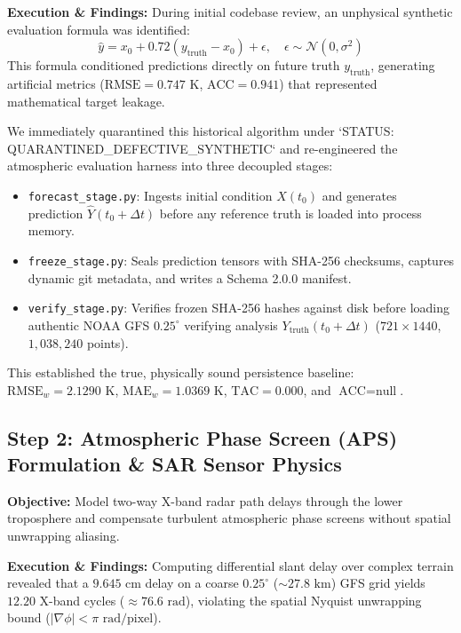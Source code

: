 \documentclass[10pt,twocolumn,letterpaper]{article}
\begin{document}
\textbf{Execution \& Findings:} During initial codebase review, an unphysical synthetic evaluation formula was identified:
\begin{equation}
    \hat{y} = x_0 + 0.72(y_{\text{truth}} - x_0) + \epsilon, \quad \epsilon \sim \mathcal{N}(0, \sigma^2)
\end{equation}
This formula conditioned predictions directly on future truth $y_{\text{truth}}$, generating artificial metrics ($\text{RMSE} = 0.747\text{ K}$, $\text{ACC} = 0.941$) that represented mathematical target leakage.

We immediately quarantined this historical algorithm under `STATUS: QUARANTINED\_DEFECTIVE\_SYNTHETIC` and re-engineered the atmospheric evaluation harness into three decoupled stages:
\begin{itemize}[leftmargin=*,noitemsep,topsep=1pt]
    \item \texttt{forecast\_stage.py}: Ingests initial condition $X(t_0)$ and generates prediction $\hat{Y}(t_0+\Delta t)$ before any reference truth is loaded into process memory.
    \item \texttt{freeze\_stage.py}: Seals prediction tensors with SHA-256 checksums, captures dynamic git metadata, and writes a Schema 2.0.0 manifest.
    \item \texttt{verify\_stage.py}: Verifies frozen SHA-256 hashes against disk before loading authentic NOAA GFS $0.25^\circ$ verifying analysis $Y_{\text{truth}}(t_0+\Delta t)$ ($721 \times 1440$, $1,038,240$ points).
\end{itemize}
This established the true, physically sound persistence baseline: $\text{RMSE}_w = 2.1290\text{ K}$, $\text{MAE}_w = 1.0369\text{ K}$, $\text{TAC} = 0.000$, and $\text{ACC} = \text{null}$.

\subsection{Step 2: Atmospheric Phase Screen (APS) Formulation \& SAR Sensor Physics}
\textbf{Objective:} Model two-way X-band radar path delays through the lower troposphere and compensate turbulent atmospheric phase screens without spatial unwrapping aliasing.

\textbf{Execution \& Findings:} Computing differential slant delay over complex terrain revealed that a $9.645\text{ cm}$ delay on a coarse $0.25^\circ$ ($\sim 27.8\text{ km}$) GFS grid yields $12.20$ X-band cycles ($\approx 76.6\text{ rad}$), violating the spatial Nyquist unwrapping bound ($\lvert\nabla\phi\rvert < \pi\text{ rad/pixel}$).
\end{document}
